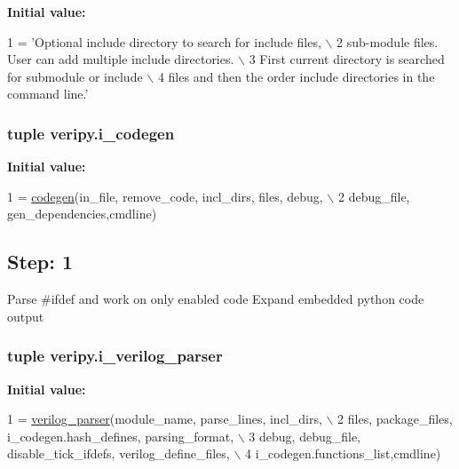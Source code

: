 {\bfseries Initial value\-:}
\begin{DoxyCode}
1 = \textcolor{stringliteral}{'Optional include directory to search for include files, \(\backslash\)}
2 \textcolor{stringliteral}{            sub-module files. User can add multiple include directories. \(\backslash\)}
3 \textcolor{stringliteral}{            First current directory is searched for submodule or include \(\backslash\)}
4 \textcolor{stringliteral}{            files and then the order include directories in the command line.'}
\end{DoxyCode}
\hypertarget{namespaceveripy_a1f71748b181889d37c2cfcf786822fef}{
\subsubsection[{i\-\_\-codegen}]{\setlength{\rightskip}{0pt plus 5cm}tuple veripy.\-i\-\_\-codegen}}\label{namespaceveripy_a1f71748b181889d37c2cfcf786822fef}
{\bfseries Initial value\-:}
\begin{DoxyCode}
1 = \hyperlink{classsrc_1_1codegen_1_1codegen}{codegen}(in\_file, remove\_code, incl\_dirs, files, debug, \(\backslash\)
2                         debug\_file, gen\_dependencies,cmdline)
\end{DoxyCode}


\subsection*{Step\-: 1 }

Parse \#ifdef and work on only enabled code Expand embedded python code output 

\hypertarget{namespaceveripy_ae26f09689713ff31ecbd1cc41f4d89e5}{
\subsubsection[{i\-\_\-verilog\-\_\-parser}]{\setlength{\rightskip}{0pt plus 5cm}tuple veripy.\-i\-\_\-verilog\-\_\-parser}}\label{namespaceveripy_ae26f09689713ff31ecbd1cc41f4d89e5}
{\bfseries Initial value\-:}
\begin{DoxyCode}
1 = \hyperlink{classsrc_1_1verilog__parser_1_1verilog__parser}{verilog\_parser}(module\_name, parse\_lines, incl\_dirs, \(\backslash\)
2             files, package\_files, i\_codegen.hash\_defines, parsing\_format, \(\backslash\)
3             debug, debug\_file, disable\_tick\_ifdefs, verilog\_define\_files, \(\backslash\)
4             i\_codegen.functions\_list,cmdline)
\end{DoxyCode}


